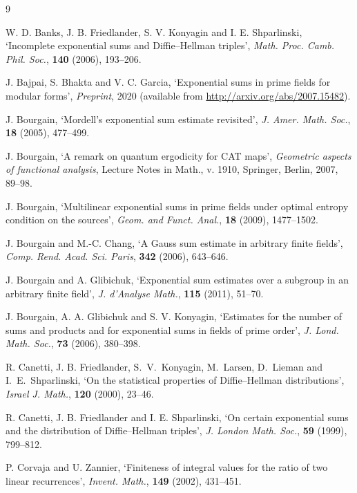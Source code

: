 \documentclass[12pt]{amsart}
\begin{document}
\begin{thebibliography}{9}

  W. D. Banks, 
J. B. Friedlander,  S. V. Konyagin and I. E. Shparlinski, 
  `Incomplete exponential sums and Diffie--Hellman triples',   
  {\it Math. Proc. Camb. Phil. Soc.\/},  {\bf 140} (2006), 193--206. 
  
  
 J.  Bajpai, S. Bhakta and V. C. Garcia, 
`Exponential sums in prime fields for modular forms',
 {\it Preprint\/}, 2020 
(available from \url{http://arxiv.org/abs/2007.15482}). 
  
   J. Bourgain, 
`Mordell's exponential sum estimate revisited',
{\it J. Amer. Math. Soc.\/}, {\bf 18} (2005), 477--499.
 

  J. Bourgain, `A remark on quantum ergodicity for CAT maps',
{\it  Geometric aspects of functional analysis\/}, Lecture Notes in Math., v. 1910, Springer, Berlin, 2007,  89--98.

 J. Bourgain, 
`Multilinear exponential sums in prime
fields under optimal entropy condition on
the sources', {\it  Geom. and Funct. Anal.\/}, 
{\bf 18} (2009), 1477--1502.

J. Bourgain and M.-C. Chang, `A Gauss sum estimate in arbitrary finite fields', 
{\it  Comp. Rend. Acad. Sci. Paris\/}, {\bf 342}
(2006),   643--646.

 J. Bourgain and A. Glibichuk, `Exponential sum estimates over a 
subgroup in an arbitrary finite field', {\it J. d'Analyse Math.\/}, {\bf 115} (2011), 51--70.

 J. Bourgain,  A. A. Glibichuk and S. V. Konyagin,
`Estimates for the number of sums and products and for exponential
sums in fields of prime order', {\it J. Lond. Math. Soc.\/}, {\bf
73} (2006), 380--398.

R. Canetti, J. B. Friedlander, S.~V.~Konyagin,
M.~Larsen, D.~Lieman and I.~E.~Shparlinski, 
`On the statistical properties of  Diffie--Hellman distributions',
{\it Israel J. Math.\/}, {\bf 120} (2000), 23--46.

R. Canetti, J. B. Friedlander and I. E. Shparlinski, 
`On certain exponential sums and the distribution
of Diffie--Hellman triples',
{\it J. London Math. Soc.\/}, {\bf 59} (1999),  799--812.

P.  Corvaja and U. Zannier, 
`Finiteness of integral values for the ratio of two linear recurrences',
{\it Invent. Math.\/}, {\bf 149} (2002),  431--451.



\end{thebibliography}
\end{document}

